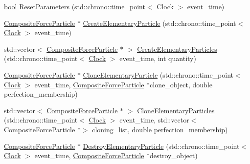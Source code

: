 \begin{DoxyCompactItemize}
bool \mbox{\hyperlink{class_composite_force_particle_ab4767179e32f6d2b4b31941dd3c48b10}{Reset\+Parameters}} (std\+::chrono\+::time\+\_\+point$<$ \mbox{\hyperlink{universe_8h_a0ef8d951d1ca5ab3cfaf7ab4c7a6fd80}{Clock}} $>$ event\+\_\+time)
\item 
\mbox{\hyperlink{class_composite_force_particle}{Composite\+Force\+Particle}} $\ast$ \mbox{\hyperlink{class_composite_force_particle_a0806069e389e30c63572c4cd6b9776d7}{Create\+Elementary\+Particle}} (std\+::chrono\+::time\+\_\+point$<$ \mbox{\hyperlink{universe_8h_a0ef8d951d1ca5ab3cfaf7ab4c7a6fd80}{Clock}} $>$ event\+\_\+time)
\item 
std\+::vector$<$ \mbox{\hyperlink{class_composite_force_particle}{Composite\+Force\+Particle}} $\ast$ $>$ \mbox{\hyperlink{class_composite_force_particle_afff866fe6f363c33c3b49fcca9005706}{Create\+Elementary\+Particles}} (std\+::chrono\+::time\+\_\+point$<$ \mbox{\hyperlink{universe_8h_a0ef8d951d1ca5ab3cfaf7ab4c7a6fd80}{Clock}} $>$ event\+\_\+time, int quantity)
\item 
\mbox{\hyperlink{class_composite_force_particle}{Composite\+Force\+Particle}} $\ast$ \mbox{\hyperlink{class_composite_force_particle_a559031016355b79ee795e621fdbbdb13}{Clone\+Elementary\+Particle}} (std\+::chrono\+::time\+\_\+point$<$ \mbox{\hyperlink{universe_8h_a0ef8d951d1ca5ab3cfaf7ab4c7a6fd80}{Clock}} $>$ event\+\_\+time, \mbox{\hyperlink{class_composite_force_particle}{Composite\+Force\+Particle}} $\ast$clone\+\_\+object, double perfection\+\_\+membership)
\item 
std\+::vector$<$ \mbox{\hyperlink{class_composite_force_particle}{Composite\+Force\+Particle}} $\ast$ $>$ \mbox{\hyperlink{class_composite_force_particle_ac27e6d3bb56272728a8c197dbcd2db4e}{Clone\+Elementary\+Particles}} (std\+::chrono\+::time\+\_\+point$<$ \mbox{\hyperlink{universe_8h_a0ef8d951d1ca5ab3cfaf7ab4c7a6fd80}{Clock}} $>$ event\+\_\+time, std\+::vector$<$ \mbox{\hyperlink{class_composite_force_particle}{Composite\+Force\+Particle}} $\ast$$>$ cloning\+\_\+list, double perfection\+\_\+membership)
\item 
\mbox{\hyperlink{class_composite_force_particle}{Composite\+Force\+Particle}} $\ast$ \mbox{\hyperlink{class_composite_force_particle_ac176d2e41d75e308d4b510f3338d8b9e}{Destroy\+Elementary\+Particle}} (std\+::chrono\+::time\+\_\+point$<$ \mbox{\hyperlink{universe_8h_a0ef8d951d1ca5ab3cfaf7ab4c7a6fd80}{Clock}} $>$ event\+\_\+time, \mbox{\hyperlink{class_composite_force_particle}{Composite\+Force\+Particle}} $\ast$destroy\+\_\+object)
\item 
$$
\end{DoxyCompactItemize}
